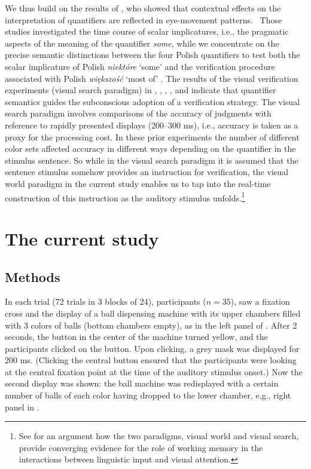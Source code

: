 \documentclass[output=paper]{langscibook}
\begin{document}
We thus build on the results of \citet{huang2009online, huang2011logic, grodner2010some, degen2011making, degen2016availability}, who showed that contextual effects on the interpretation of quantifiers are reflected in eye-movement patterns. \ Those
studies investigated the time course of scalar implicatures, i.e., the pragmatic aspects of the meaning of the quantifier
\textit{some}, while we concentrate on the precise semantic distinctions between the four Polish quantifiers to test
both the scalar implicature of Polish \textit{niektóre} `some' \citep{spychalska-msc} and the verification procedure associated
with Polish \textit{większość} `most of' \citep{szymanik2010comprehension}. The results of the visual verification experiments (visual search
paradigm) in 
\citet{pietroski2009meaning}, \citet{lidz2011interface}, \citet{tomaszewicz2011verification, tomaszewicz2012semantics, tomaszewicz2013linguistic}, \citet{hunter2017verification}, and \citet{Knowlton2021} indicate that quantifier
semantics guides the subconscious adoption of a verification strategy. The visual search paradigm involves comparisons
of the accuracy of judgments with reference to rapidly presented displays (200--300 ms), i.e., accuracy is taken as a
proxy for the processing cost. In these prior experiments the number of different color sets affected accuracy in different
ways depending on the quantifier in the stimulus sentence. So while in the visual search paradigm it is assumed that
the sentence stimulus somehow provides an instruction for verification, the visual world paradigm in the current
study enables us to tap into the real-time construction of this instruction as the auditory stimulus unfolds.\footnote{See
\citet{huettig2011looking} for an argument how the two paradigms, visual world and visual search, provide converging evidence
for the role of working memory in the interactions between linguistic input and visual attention.}





\section{The current study} 
\subsection{Methods} \label{tom:Methods}

In each trial (72 trials in 3 blocks of 24), participants ($n=35$), saw a fixation cross and the display of a
ball dispensing machine with its upper chambers filled with 3 colors of balls (bottom chambers empty), as in the left panel of . After 2 seconds, the button in the center of the machine turned yellow, and the participants clicked on the
button. Upon clicking, a grey mask was displayed for 200 ms. (Clicking the central button ensured that the participants were
looking at the central fixation point at the time of the auditory stimulus onset.) Now the second display was shown: the
ball machine was redisplayed with a certain number of balls of each color having dropped to the lower chamber,
e.g., right panel in . 
\end{document}
